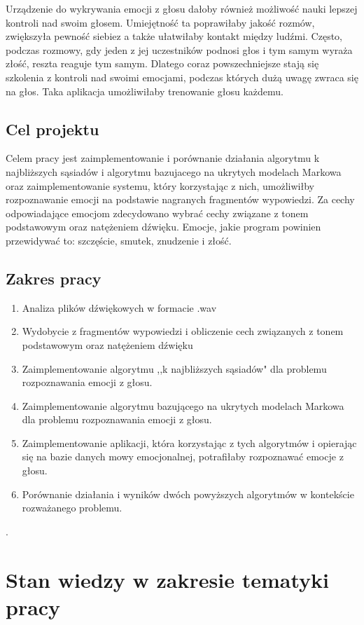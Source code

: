 \documentclass[declaration,shortabstract]{iithesis}
\begin{document}
Urządzenie do wykrywania emocji z głosu dałoby również możliwość nauki lepszej kontroli nad swoim głosem. Umiejętność ta poprawiłaby jakość rozmów, zwiększyła pewność siebiez a także ułatwiłaby kontakt między ludźmi. Często, podczas rozmowy, gdy jeden z jej uczestników podnosi głos i tym samym wyraża złość, reszta reaguje tym samym. Dlatego coraz powszechniejsze stają się szkolenia z kontroli nad swoimi emocjami, podczas których dużą uwagę zwraca się na głos. Taka aplikacja umożliwiłaby trenowanie głosu każdemu. 

\section{Cel projektu}
Celem pracy jest zaimplementowanie i porównanie działania algorytmu k najbliższych sąsiadów i algorytmu bazujacego na ukrytych modelach Markowa oraz zaimplementowanie systemu, który korzystając z nich, umożliwiłby rozpoznawanie emocji na podstawie nagranych fragmentów wypowiedzi.
Za cechy odpowiadające emocjom zdecydowano wybrać cechy związane z tonem podstawowym oraz natężeniem dźwięku. Emocje, jakie program powinien przewidywać to: szczęście, smutek, znudzenie i złość.

\section{Zakres pracy}
\begin{enumerate}
\item Analiza plików dźwiękowych w formacie .wav
\item Wydobycie z fragmentów wypowiedzi i obliczenie cech związanych z tonem podstawowym oraz natężeniem dźwięku
\item Zaimplementowanie algorytmu ,,k najbliższych sąsiadów" dla problemu rozpoznawania emocji z głosu.
\item Zaimplementowanie algorytmu bazującego na ukrytych modelach Markowa dla problemu rozpoznawania emocji z głosu.
\item Zaimplementowanie aplikacji, która korzystając z tych algorytmów i opierając się na bazie danych mowy emocjonalnej, potrafiłaby rozpoznawać emocje z głosu.
\item Porównanie działania i wyników dwóch powyższych algorytmów w kontekście rozważanego problemu.
\end{enumerate}.

\chapter{Stan wiedzy w zakresie tematyki pracy}
\end{document}
